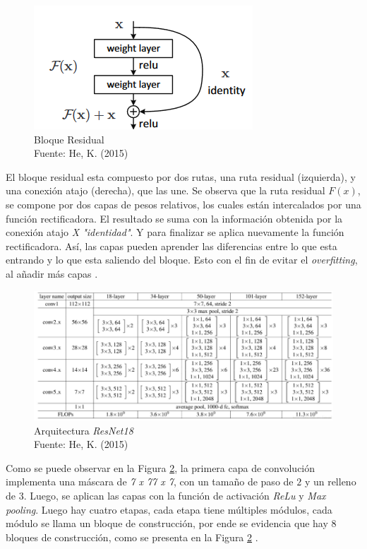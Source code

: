 \newpage
\begin{figure}[ht]
	\centering
	\includegraphics[scale=0.7]{Figs/67.png}
	\caption{Bloque Residual \\ Fuente: He, K. (2015) }
	\label{fig:Bloque}
\end{figure}

El bloque residual esta compuesto por dos rutas, una ruta residual (izquierda), y una conexión atajo (derecha), que las une. Se observa que la ruta residual $F(x)$, se compone por dos capas de pesos relativos, los cuales están intercalados por una función rectificadora. El resultado se suma con la información obtenida por la conexión atajo \textit{X "identidad"}. Y para finalizar se aplica nuevamente la función rectificadora. Así, las capas pueden aprender las diferencias entre lo que esta entrando y lo que esta saliendo del bloque. Esto con el fin de evitar el \textit{overfitting}, al añadir más capas \cite{18-2}.

\begin{figure}[ht]
	\centering
	\includegraphics[scale=0.65]{Figs/68.png}
	\caption{Arquitectura \textit{ResNet18} \\ Fuente: He, K. (2015)}
	\label{fig:ArqRes18}
\end{figure}

Como se puede observar en la Figura \ref{fig:ArqRes18}, la primera capa de convolución implementa una máscara de \textit{7 x 77 x 7}, con un tamaño de paso de $2$ y un relleno de $3$. Luego, se aplican las capas con la función de activación \textit{ReLu} y \textit{Max pooling}. Luego hay cuatro etapas, cada etapa tiene múltiples módulos, cada módulo se llama un bloque de construcción, por ende se evidencia que hay 8 bloques de construcción, como se presenta en la Figura \ref{fig:ArqRes18} \cite{ref_5}.\\		
	
